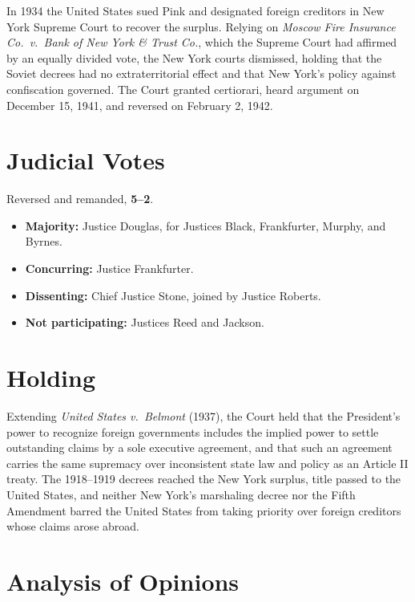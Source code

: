 \documentclass[12pt]{article}
\begin{document}
In 1934 the United States sued Pink and designated foreign creditors in New York Supreme Court to recover the surplus. Relying on \textit{Moscow Fire Insurance Co.\ v.\ Bank of New York \& Trust Co.}, which the Supreme Court had affirmed by an equally divided vote, the New York courts dismissed, holding that the Soviet decrees had no extraterritorial effect and that New York's policy against confiscation governed. The Court granted certiorari, heard argument on December 15, 1941, and reversed on February 2, 1942.

\section{Judicial Votes}

Reversed and remanded, \textbf{5--2}.
\begin{itemize}
\item \textbf{Majority:} Justice Douglas, for Justices Black, Frankfurter, Murphy, and Byrnes.
\item \textbf{Concurring:} Justice Frankfurter.
\item \textbf{Dissenting:} Chief Justice Stone, joined by Justice Roberts.
\item \textbf{Not participating:} Justices Reed and Jackson.
\end{itemize}

\section{Holding}

Extending \textit{United States v.\ Belmont} (1937), the Court held that the President's power to recognize foreign governments includes the implied power to settle outstanding claims by a sole executive agreement, and that such an agreement carries the same supremacy over inconsistent state law and policy as an Article II treaty. The 1918--1919 decrees reached the New York surplus, title passed to the United States, and neither New York's marshaling decree nor the Fifth Amendment barred the United States from taking priority over foreign creditors whose claims arose abroad.

\section{Analysis of Opinions}
\end{document}
